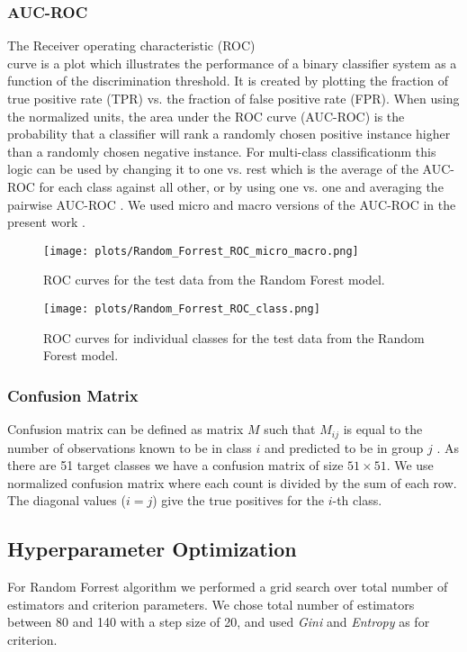\documentclass[sigconf]{acmart}
\begin{document}
\subsubsection{AUC-ROC}
The Receiver operating characteristic (ROC)\\curve is a plot which illustrates the performance of a binary classifier system as a function of the discrimination threshold. It is created by plotting the fraction of true positive rate (TPR) vs. the fraction of false positive rate (FPR). When using the normalized units, the area under the ROC curve (AUC-ROC) is the probability that a classifier will rank a randomly chosen positive instance higher than a randomly chosen negative instance. For multi-class classificationm this logic can be used by changing it to one vs. rest which is the average of the AUC-ROC for each class against all other, or by using one vs. one and averaging the pairwise AUC-ROC \cite{10.1016/j.patrec.2005.10.010,10.1023/A:1010920819831}. We used micro and macro versions of the AUC-ROC in the present work \cite{scikit-learn}.
\begin{figure}[h]
    \centering
    \texttt{[image: plots/Random\_Forrest\_ROC\_micro\_macro.png]}
    \caption{ROC curves for the test data from the Random Forest model.}
    \label{fig:roc_micro_macro}
\end{figure}
\begin{figure*}[h!]
    \centering
    \texttt{[image: plots/Random\_Forrest\_ROC\_class.png]}
    \caption{ROC curves for individual classes for the test data from the Random Forest model.}
    \label{fig:roc_all_class}
\end{figure*}
\subsubsection{Confusion Matrix} 
Confusion matrix can be defined as matrix $M$ such that $M_{ij}$ is equal to the number of observations known to be in class $i$ and predicted to be in group $j$ \cite{scikit-learn}. As there are 51 target classes we have a confusion matrix of size $51 \times 51$. We use normalized confusion matrix\cite{scikit-learn} where each count is divided by the sum of each row. The diagonal values ($i=j$) give the true positives for the $i$-th class.

\subsection{Hyperparameter Optimization}
For Random Forrest algorithm we performed a grid search over total number of estimators and criterion parameters. We chose total number of estimators between 80 and 140 with a step size of 20, and used \textit{Gini} and \textit{Entropy} as for criterion. 
\end{document}
